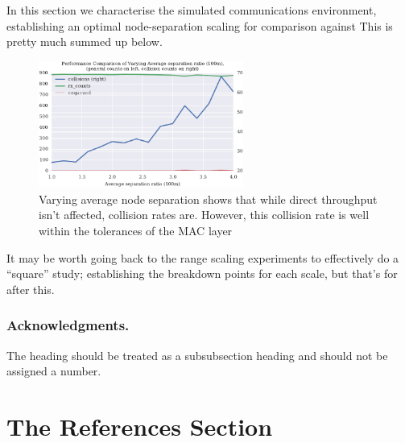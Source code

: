 \documentclass[runningheads,a4paper]{llncs}
\begin{document}
In this section we characterise the simulated communications environment, establishing an optimal node-separation scaling for comparison against \cite{Guo11}
This is pretty much summed up below.
\begin{figure}[h]
  \centering
  \includegraphics[width=0.6\textwidth]{img/throughput_performance_range.pdf}
  \caption{Varying average node separation shows that while direct throughput isn't affected, collision rates are. However, this collision rate is well within the tolerances of the MAC layer}
  \label{fig:throughput_performance}
\end{figure}

It may be worth going back to the range scaling experiments to effectively do a ``square'' study; establishing the breakdown points for each scale, but that's for after this.


\subsubsection*{Acknowledgments.} The heading should be treated as a
subsubsection heading and should not be assigned a number.

\section{The References Section}\label{references}
\end{document}

